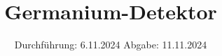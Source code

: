

\subject{V18}
\title{Germanium-Detektor}
\date{%
  Durchführung: 6.11.2024
  \hspace{3em}
  Abgabe: 11.11.2024
}
\usepackage{comment}


\maketitle
\thispagestyle{empty}
\tableofcontents
\newpage







\printbibliography{}


